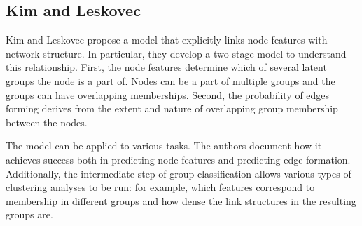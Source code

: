 \subsection{Kim and Leskovec}

Kim and Leskovec propose a model that explicitly links node features with network structure. In particular, they develop a two-stage model to understand this relationship. First, the node features determine which of several latent groups the node is a part of. Nodes can be a part of multiple groups and the groups can have overlapping memberships. Second, the probability of edges forming derives from the extent and nature of overlapping group membership between the nodes.

The model can be applied to various tasks. The authors document how it achieves success both in predicting node features and predicting edge formation. Additionally, the intermediate step of group classification allows various types of clustering analyses to be run: for example, which features correspond to membership in different groups and how dense the link structures in the resulting groups are.
